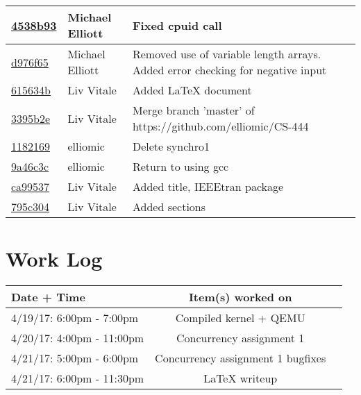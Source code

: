 \documentclass[letterpaper,10pt,titlepage,draftclsnofoot,onecolumn]{IEEEtran}
\begin{document}
\begin{tabular}{l l l}
\href{https://github.com/elliomic/CS-444/commit/4538b939bed2cc80ab0b8940c419877d51f693bc}{4538b93} & Michael Elliott & Fixed cpuid call\\\hline
\href{https://github.com/elliomic/CS-444/commit/d976f657bc72165f444aac68eeecfdda2d2e1afe}{d976f65} & Michael Elliott & Removed use of variable length arrays. Added error checking for negative input\\\hline
\href{https://github.com/elliomic/CS-444/commit/615634bdd2be122c6401c6c7ccf23e457ca09c84}{615634b} & Liv Vitale & Added LaTeX document\\\hline
\href{https://github.com/elliomic/CS-444/commit/3395b2e4d682283838e8cb97063e5517bb5b5d30}{3395b2e} & Liv Vitale & Merge branch 'master' of https://github.com/elliomic/CS-444\\\hline
\href{https://github.com/elliomic/CS-444/commit/1182169eca1f04759352581b206d7715f24499ca}{1182169} & elliomic & Delete synchro1\\\hline
\href{https://github.com/elliomic/CS-444/commit/9a46c3c9bab82e9618cddc3e1ddca4f4e3ae0765}{9a46c3c} & elliomic & Return to using gcc\\\hline
\href{https://github.com/elliomic/CS-444/commit/ca99537566dcc4c0aa6cac3e045d5fefad09dd46}{ca99537} & Liv Vitale & Added title, IEEEtran package\\\hline
\href{https://github.com/elliomic/CS-444/commit/795c3046ccb4c7bab06b6d779d74d179c68776d6}{795c304} & Liv Vitale & Added sections\\\hline\end{tabular}


\section{Work Log}
\begin{tabular}{l | c | r}
Date + Time & Item(s) worked on \\
\hline
4/19/17: 6:00pm - 7:00pm & Compiled kernel + QEMU \\
4/20/17: 4:00pm - 11:00pm & Concurrency assignment 1 \\
4/21/17: 5:00pm - 6:00pm & Concurrency assignment 1 bugfixes \\
4/21/17: 6:00pm - 11:30pm & LaTeX writeup \\
\end{tabular}

\nocite{*}



\end{document}
